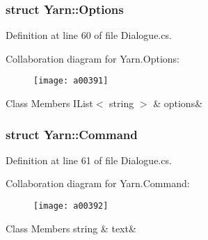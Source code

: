 \subsubsection{struct Yarn\-:\-:Options}


Definition at line 60 of file Dialogue.\-cs.



Collaboration diagram for Yarn.\-Options\-:
\nopagebreak
\begin{figure}[H]
\begin{center}
\leavevmode
\texttt{[image: a00391]}
\end{center}
\end{figure}
\begin{DoxyFields}{Class Members}
\hypertarget{a00051_ae8c616d923ceeeed192a9436c55d9917}{I\-List$<$ string $>$}\label{a00051_ae8c616d923ceeeed192a9436c55d9917}
&
options&
\\
\hline

\end{DoxyFields}
\label{a00373}
\hypertarget{a00051_a00373}{}
\subsubsection{struct Yarn\-:\-:Command}


Definition at line 61 of file Dialogue.\-cs.



Collaboration diagram for Yarn.\-Command\-:
\nopagebreak
\begin{figure}[H]
\begin{center}
\leavevmode
\texttt{[image: a00392]}
\end{center}
\end{figure}
\begin{DoxyFields}{Class Members}
\hypertarget{a00051_a8564e5104566e145f5d917ec846444d9}{string}\label{a00051_a8564e5104566e145f5d917ec846444d9}
&
text&
\\
\hline

\end{DoxyFields}
